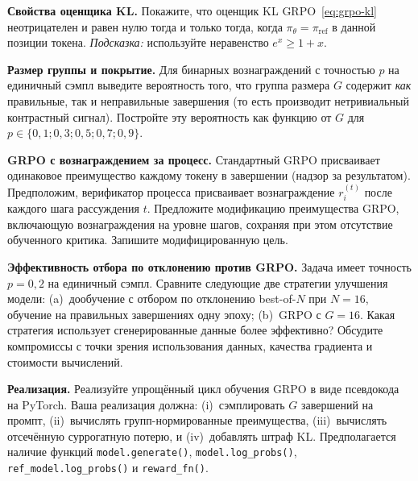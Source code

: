 \begin{exercise}
\label{ex:grpo-6}
\textbf{Свойства оценщика KL.} Покажите, что оценщик KL GRPO~\eqref{eq:grpo-kl} неотрицателен и равен нулю тогда и только тогда, когда $\pi_\theta = \pi_\mathrm{ref}$ в данной позиции токена. \emph{Подсказка:} используйте неравенство $e^x \geq 1 + x$.
\end{exercise}

\begin{exercise}
\label{ex:grpo-7}
\textbf{Размер группы и покрытие.} Для бинарных вознаграждений с точностью $p$ на единичный сэмпл выведите вероятность того, что группа размера $G$ содержит \emph{как} правильные, так и неправильные завершения (то есть производит нетривиальный контрастный сигнал). Постройте эту вероятность как функцию от $G$ для $p \in \{0{,}1; 0{,}3; 0{,}5; 0{,}7; 0{,}9\}$.
\end{exercise}

\begin{exercise}
\label{ex:grpo-8}
\textbf{GRPO с вознаграждением за процесс.} Стандартный GRPO присваивает одинаковое преимущество каждому токену в завершении (надзор за результатом). Предположим, верификатор процесса присваивает вознаграждение $r_i^{(t)}$ после каждого шага рассуждения $t$. Предложите модификацию преимущества GRPO, включающую вознаграждения на уровне шагов, сохраняя при этом отсутствие обученного критика. Запишите модифицированную цель.
\end{exercise}

\begin{exercise}
\label{ex:grpo-9}
\textbf{Эффективность отбора по отклонению против GRPO.} Задача имеет точность $p = 0{,}2$ на единичный сэмпл. Сравните следующие две стратегии улучшения модели: (a)~дообучение с отбором по отклонению best-of-$N$ при $N = 16$, обучение на правильных завершениях одну эпоху; (b)~GRPO с $G = 16$. Какая стратегия использует сгенерированные данные более эффективно? Обсудите компромиссы с точки зрения использования данных, качества градиента и стоимости вычислений.
\end{exercise}

\begin{exercise}
\label{ex:grpo-10}
\textbf{Реализация.} Реализуйте упрощённый цикл обучения GRPO в виде псевдокода на PyTorch. Ваша реализация должна: (i)~сэмплировать $G$ завершений на промпт, (ii)~вычислять групп-нормированные преимущества, (iii)~вычислять отсечённую суррогатную потерю, и (iv)~добавлять штраф KL. Предполагается наличие функций \texttt{model.generate()}, \texttt{model.log\_probs()}, \texttt{ref\_model.log\_probs()} и \texttt{reward\_fn()}.
\end{exercise}
